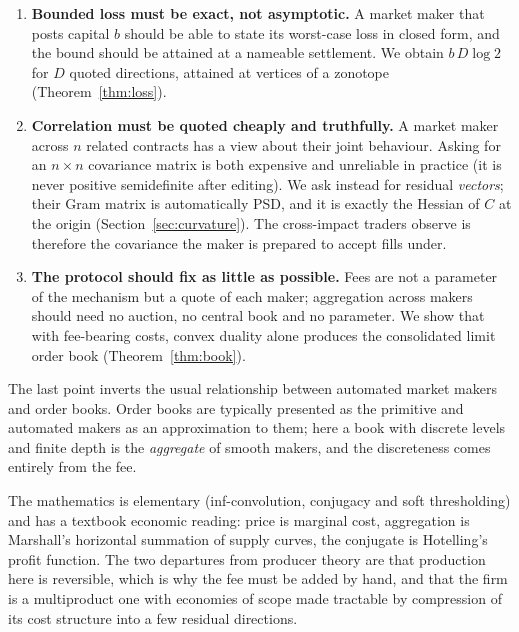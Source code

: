 \documentclass[11pt]{article}
\theoremstyle{definition}
\theoremstyle{remark}
\begin{document}
\begin{enumerate}[leftmargin=2em]
\item \textbf{Bounded loss must be exact, not asymptotic.} A market maker that posts capital $b$ should be able to
state its worst-case loss in closed form, and the bound should be attained at a nameable settlement. We obtain
$b\,D\log 2$ for $D$ quoted directions, attained at vertices of a zonotope (Theorem~\ref{thm:loss}).

\item \textbf{Correlation must be quoted cheaply and truthfully.} A market maker across $n$ related contracts has a
view about their joint behaviour. Asking for an $n\times n$ covariance matrix is both expensive and unreliable in
practice (it is never positive semidefinite after editing). We ask instead for residual \emph{vectors}; their Gram
matrix is automatically PSD, and it is exactly the Hessian of $C$ at the origin (Section~\ref{sec:curvature}). The
cross-impact traders observe is therefore the covariance the maker is prepared to accept fills under.

\item \textbf{The protocol should fix as little as possible.} Fees are not a parameter of the mechanism but a quote
of each maker; aggregation across makers should need no auction, no central book and no parameter. We show that
with fee-bearing costs, convex duality alone produces the consolidated limit order book (Theorem~\ref{thm:book}).
\end{enumerate}

The last point inverts the usual relationship between automated market makers and order books. Order books are typically presented as the primitive and automated makers as an approximation to
them; here a book with discrete levels and finite depth is the \emph{aggregate} of smooth makers, and the discreteness
comes entirely from the fee.

The mathematics is elementary (inf-convolution, conjugacy and soft thresholding) and has a textbook economic
reading: price is marginal cost, aggregation is Marshall's horizontal summation of supply
curves, the conjugate is Hotelling's profit function. The two departures from producer theory are that production
here is reversible, which is why the fee must be added by hand, and that the firm is a multiproduct one with
economies of scope made tractable by compression of its cost structure into a few residual directions.
\end{document}
